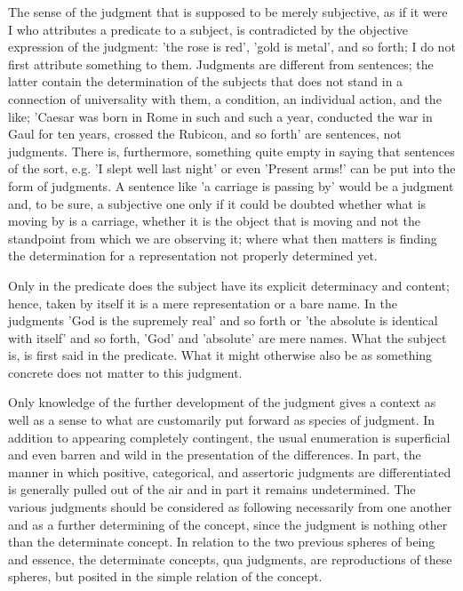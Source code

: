 The sense of the judgment that is supposed to be merely subjective,
as if it were I who attributes a predicate to a subject,
is contradicted by the objective expression of the judgment:
'the rose is red', 'gold is metal', and so forth;
I do not first attribute something to them.
Judgments are different from sentences;
the latter contain the determination of the subjects
that does not stand in a connection of universality with them,
a condition, an individual action, and the like;
'Caesar was born in Rome in such and such a year,
conducted the war in Gaul for ten years, crossed the Rubicon,
and so forth' are sentences, not judgments.
There is, furthermore, something quite empty
in saying that sentences of the sort, e.g.
'I slept well last night' or even 'Present arms!'
can be put into the form of judgments.
A sentence like 'a carriage is passing by' would be a judgment
and, to be sure, a subjective one only if it could be doubted
whether what is moving by is a carriage,
whether it is the object that is moving and not
the standpoint from which we are observing it;
where what then matters is finding the determination
for a representation not properly determined yet.

Only in the predicate does the subject
have its explicit determinacy and content;
hence, taken by itself it is a mere representation or a bare name.
In the judgments 'God is the supremely real' and so forth
or 'the absolute is identical with itself' and so forth,
'God' and 'absolute' are mere names.
What the subject is, is first said in the predicate.
What it might otherwise also be as something concrete
does not matter to this judgment.

Only knowledge of the further development of the judgment
gives a context as well as a sense to what are customarily
put forward as species of judgment.
In addition to appearing completely contingent,
the usual enumeration is superficial and
even barren and wild in the presentation of the differences.
In part, the manner in which positive, categorical, and assertoric
judgments are differentiated is generally pulled out of the air and
in part it remains undetermined.
The various judgments should be considered as following necessarily
from one another and as a further determining of the concept,
since the judgment is nothing other than the determinate concept.
In relation to the two previous spheres of being and essence,
the determinate concepts, qua judgments, are reproductions of
these spheres, but posited in the simple relation of the concept.

